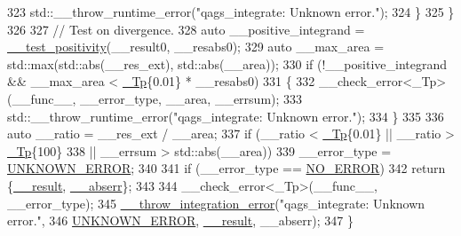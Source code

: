\begin{DoxyCode}
323               std::\_\_throw\_runtime\_error(\textcolor{stringliteral}{"qags\_integrate: Unknown error."});
324             \}
325         \}
326 
327       \textcolor{comment}{// Test on divergence.}
328       \textcolor{keyword}{auto} \_\_positive\_integrand = \hyperlink{namespace____gnu__cxx_a5e2bf5bffa1d3764b8dc10d04d5c66db}{\_\_test\_positivity}(\_\_result0, \_\_resabs0);
329       \textcolor{keyword}{auto} \_\_max\_area = std::max(std::abs(\_\_res\_ext), std::abs(\_\_area));
330       \textcolor{keywordflow}{if} (!\_\_positive\_integrand && \_\_max\_area < \hyperlink{namespace____gnu__cxx_a3b19a9c800ca194374ef9172290f7d79}{\_Tp}\{0.01\} * \_\_resabs0)
331         \{
332           \_\_check\_error<\_Tp>(\_\_func\_\_, \_\_error\_type, \_\_area, \_\_errsum);
333           std::\_\_throw\_runtime\_error(\textcolor{stringliteral}{"qags\_integrate: Unknown error."});
334         \}
335 
336       \textcolor{keyword}{auto} \_\_ratio = \_\_res\_ext / \_\_area;
337       \textcolor{keywordflow}{if} (\_\_ratio < \hyperlink{namespace____gnu__cxx_a3b19a9c800ca194374ef9172290f7d79}{\_Tp}\{0.01\} || \_\_ratio > \hyperlink{namespace____gnu__cxx_a3b19a9c800ca194374ef9172290f7d79}{\_Tp}\{100\}
338           || \_\_errsum > std::abs(\_\_area))
339         \_\_error\_type = \hyperlink{namespace____gnu__cxx_ad6c62dd86a596716cece6ac2d4cfd4b3a7c57c614db2692fad0a19cb2ded33ed3}{UNKNOWN\_ERROR};
340 
341       \textcolor{keywordflow}{if} (\_\_error\_type == \hyperlink{namespace____gnu__cxx_ad6c62dd86a596716cece6ac2d4cfd4b3ac31eecc280b10dec2efb4a2216ccc2e0}{NO\_ERROR})
342         \textcolor{keywordflow}{return} \{\hyperlink{namespace____gnu__cxx_a500ea9f53aeaecd8c2ae657503450578}{\_\_result}, \hyperlink{namespace____gnu__cxx_a72f736cff127f1574e91a301de9e074b}{\_\_abserr}\};
343 
344       \_\_check\_error<\_Tp>(\_\_func\_\_, \_\_error\_type);
345       \hyperlink{namespace____gnu__cxx_a2ae22137ca092b8ae10f4d42b4e32cfb}{\_\_throw\_integration\_error}(\textcolor{stringliteral}{"qags\_integrate: Unknown error."},
346                                 \hyperlink{namespace____gnu__cxx_ad6c62dd86a596716cece6ac2d4cfd4b3a7c57c614db2692fad0a19cb2ded33ed3}{UNKNOWN\_ERROR}, \hyperlink{namespace____gnu__cxx_a500ea9f53aeaecd8c2ae657503450578}{\_\_result}, \_\_abserr);
347     \}
\end{DoxyCode}
\mbox{\label{namespace____gnu__cxx_a8b6964018d33496542948228e467acb1}} 
